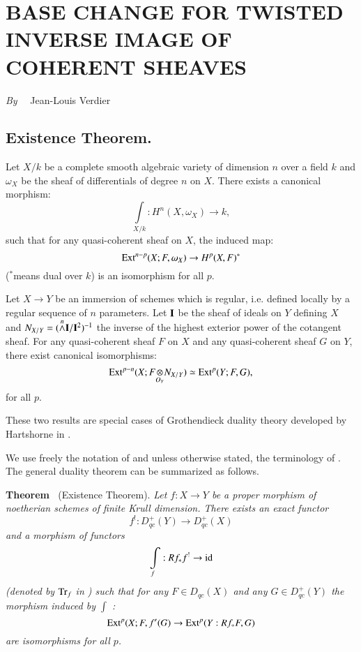 \chapter[\textsc{J.-L. Verdier~:} Base Change for Twisted Inverse Image of Coherent Sheaves]{BASE CHANGE FOR TWISTED INVERSE IMAGE OF COHERENT SHEAVES}\label{art20}

\begin{center}
{\em By}~~ Jean-Louis Verdier
\end{center}

\setcounter{pageoriginal}{392}
\section{Existence Theorem.}\label{art20-sec1}
\pageoriginale


Let $X/k$ be a complete smooth algebraic variety of dimension $n$ over a field $k$ and $\omega_{X}$ be the sheaf of differentials of degree $n$ on $X$. There exists a canonical morphism:
$$
\int\limits_{X/k}:H^{n}(X,\omega_{X})\to k,
$$
such that for any quasi-coherent sheaf on $X$, the induced map:
$$
\operatorname{\mathrm{Ext}}^{n-p}(X;F,\omega_{X})\to H^{p}(X,F)^{*}
$$
($^{*}$means dual over $k$) is an isomorphism for all $p$.

Let $X\to Y$ be an immersion of schemes which is regular, i.e. defined locally by a regular sequence of $n$ parameters. Let $\mathbf{I}$ be the sheaf of ideals on $Y$ defining $X$ and $N_{X/Y}=({\displaystyle{\mathop{\wedge}\limits^{n}}}\mathbf{I}/\mathbf{I}^{2})^{-1}$ the inverse of the highest exterior power of the cotangent sheaf. For any quasi-coherent sheaf $F$ on $X$ and any quasi-coherent sheaf $G$ on $Y$, there exist canonical isomorphisms:
$$
\Ext^{p-n}(X;\foprod{F}{N_{X/Y}}{O_{Y}})\simeq \Ext^{p}(Y;F,G),
$$
for all $p$.

These two results are special cases of Grothendieck duality theory developed by Hartshorne in \cite{art20-key1}.

We use freely the notation of \cite{art20-key1} and unless otherwise stated, the terminology of \cite{art20-key1}. The general duality theorem can be summarized as follows.

\medskip
\noindent
{\bf Theorem \label{art20-thm1}}~(Existence Theorem).
{\em Let $f:X\to Y$ be a proper morphism of noetherian schemes of finite Krull dimension. There exists an exact functor}
$$
f^{!}:D^{+}_{qc}(Y)\to D^{+}_{qc}(X)
$$
{\em and a morphism of functors}
$$
\int\limits_{f}:Rf_{*}f^{!}\to \operatorname{\mathrm{id}}
$$\pageoriginale
{\em (denoted by $\operatorname{\mathrm{Tr}}_{f}$ in \cite{art20-key1}) such that for any $F\in D_{qc}(X)$ and any $G\in D^{+}_{qc}(Y)$ the morphism induced by $\int$ :}
$$
\operatorname{\mathrm{Ext}}^{p}(X;F,f'(G)\to \operatorname{\mathrm{Ext}}^{p}(Y:Rf_{*}F,G)
$$
{\em are isomorphisms for all $p$.}
\smallskip

